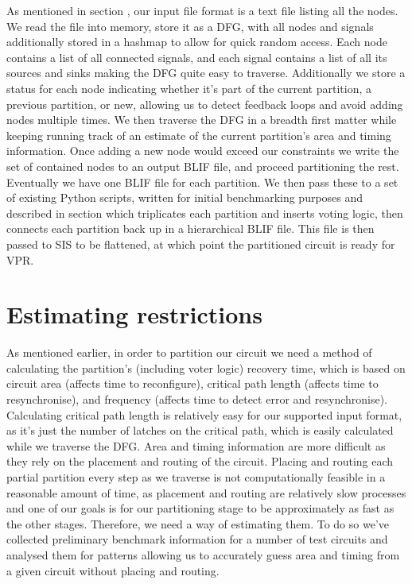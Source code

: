 \documentclass[12pt,drafta4paper,oneside]{memoir} %
\begin{document}
{As mentioned in section , our input file format is a text file listing all the nodes. We read the file into memory, store it as a \ac{DFG}, with all nodes and signals additionally stored in a hashmap to allow for quick random access. Each node contains a list of all connected signals, and each signal contains a list of all its sources and sinks making the \ac{DFG} quite easy to traverse. Additionally we store a status for each node indicating whether it's part of the current partition, a previous partition, or new, allowing us to detect feedback loops and avoid adding nodes multiple times.
We then traverse the \ac{DFG} in a breadth first matter while keeping running track of an estimate of the current partition's area and timing information. Once adding a new node would exceed our constraints we write the set of contained nodes to an output \ac{BLIF} file, and proceed partitioning the rest. Eventually we have one \ac{BLIF} file for each partition. We then pass these to a set of existing Python scripts, written for initial benchmarking purposes and described in section  which triplicates each partition and inserts voting logic, then connects each partition back up in a hierarchical \ac{BLIF} file. This file is then passed to \ac{SIS}  to be flattened, at which point the partitioned circuit is ready for \ac{VPR}.


\section{Estimating restrictions}
As mentioned earlier, in order to partition our circuit we need a method of calculating the partition's (including voter logic) recovery time, which is based on circuit area (affects time to reconfigure), critical path length (affects time to resynchronise), and frequency (affects time to detect error and resynchronise). Calculating critical path length is relatively easy for our supported input format, as it's just the number of latches on the critical path, which is easily calculated while we traverse the \ac{DFG}.
Area and timing information are more difficult as they rely on the placement and routing of the circuit. Placing and routing each partial partition every step as we traverse is not computationally feasible in a reasonable amount of time, as placement and routing are relatively slow processes and one of our goals is for our partitioning stage to be approximately as fast as the other stages. Therefore, we need a way of estimating them. To do so we've collected preliminary benchmark information for a number of test circuits and analysed them for patterns allowing us to accurately guess area and timing from a given circuit without placing and routing.

}
\end{document}
